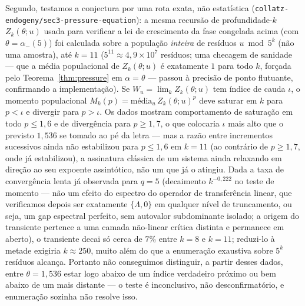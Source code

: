 \documentclass[11pt]{article}
\theoremstyle{definition}
\theoremstyle{remark}
\begin{document}
Segundo, testamos a conjectura por uma rota exata, não estatística
(\texttt{collatz-endogeny/\allowbreak sec3-pressure-equation}):
a mesma recursão de profundidade-$k$ $Z_k(\theta;u)$ usada para verificar
a lei de crescimento da fase congelada acima (com $\theta=\alpha_-(5)$)
foi calculada sobre a população \emph{inteira} de resíduos $u\bmod
5^k$ (não uma amostra), até $k=11$ ($5^{11}\approx4{,}9\times10^7$
resíduos; uma checagem de sanidade --- que a média populacional de
$Z_k(\theta;u)$ é exatamente $1$ para todo $k$, forçada pelo
Teorema~\ref{thm:pressure} em $\alpha=\theta$ --- passou à precisão de
ponto flutuante, confirmando a implementação). Se $W_u=\lim_k
Z_k(\theta;u)$ tem índice de cauda $\iota$, o momento populacional
$M_k(p)=\text{média}_u\,Z_k(\theta;u)^p$ deve saturar em $k$ para
$p<\iota$ e divergir para $p>\iota$. Os dados mostram comportamento de
saturação em todo $p\le1{,}6$ e de divergência para $p\ge1{,}7$, o que
colocaria $\iota$ mais alto que o previsto $1{,}536$ se tomado ao pé da
letra --- mas a razão entre incrementos sucessivos ainda não
estabilizou para $p\le1{,}6$ em $k=11$ (ao contrário de $p\ge1{,}7$,
onde já estabilizou), a assinatura clássica de um sistema ainda
relaxando em direção ao seu expoente assintótico, não um que já o
atingiu. Dada a taxa de convergência lenta já observada para $q=5$
(decaimento $k^{-0{,}222}$ no teste de momento --- não um efeito do
espectro do operador de transferência linear, que verificamos depois
ser exatamente $\{\Lambda,0\}$ em qualquer nível de truncamento, ou
seja, um gap espectral perfeito, sem autovalor subdominante isolado; a
origem do transiente pertence a uma camada não-linear crítica distinta
e permanece em aberto), o transiente decai só cerca de $7\%$ entre
$k=8$ e $k=11$; reduzi-lo à metade exigiria $k\approx250$, muito além
do que a enumeração exaustiva sobre $5^k$ resíduos alcança. Portanto
não conseguimos distinguir, a partir desses dados, entre
$\theta=1{,}536$ estar logo abaixo de um índice verdadeiro próximo ou
bem abaixo de um mais distante --- o teste é inconclusivo, não
desconfirmatório, e enumeração sozinha não resolve isso.
\end{document}
